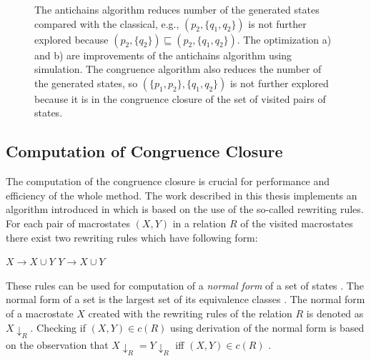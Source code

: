 \begin{figure}[bt]
\begin{center}
{{      The antichains algorithm reduces number of the generated states compared with the classical,
      e.g., $(p_2,\{q_1,q_2\})$ is not further explored because $(p_2,\{q_2\}) \sqsubseteq (p_2,\{q_1,q_2\})$. 
      The optimization a) and b) are improvements of the antichains algorithm using simulation. 
      The congruence algorithm also reduces the number of the generated states, so $(\{p_1,p_2\},\{q_1,q_2\})$ 
      is not further explored because it is in the congruence closure 
      of the set of visited pairs of states.}}
  \label{automata}
\end{center}
\end{figure}

\subsection{Computation of Congruence Closure}
\label{subsectionCongr}
The computation of the congruence closure is crucial for performance and efficiency of the whole method. The work described in this thesis implements
an algorithm introduced in \cite{popl13} which is based on the use of the so-called rewriting rules. For each pair of macrostates $(X,Y)$ in 
a relation $R$ of the visited macrostates there exist two rewriting rules which have following form:
\begin{center}
$X\rightarrow X\cup Y$ \hspace{5cm} $Y\rightarrow X\cup Y$
\end{center}

These rules can be used for computation of a \emph{normal form} of a set of states \cite{popl13}. The normal form of a set is the
largest set of its equivalence classes \cite{popl13}. The normal form of a macrostate $X$ created with
the rewriting rules of the relation $R$ is denoted as $X{\downarrow_R}$.
Checking if $(X,Y)\in c(R)$ using derivation of the normal form is based on the observation that $X{\downarrow_R}=Y{\downarrow_R}$ 
iff $(X,Y)\in c(R)$ \cite{popl13}.

